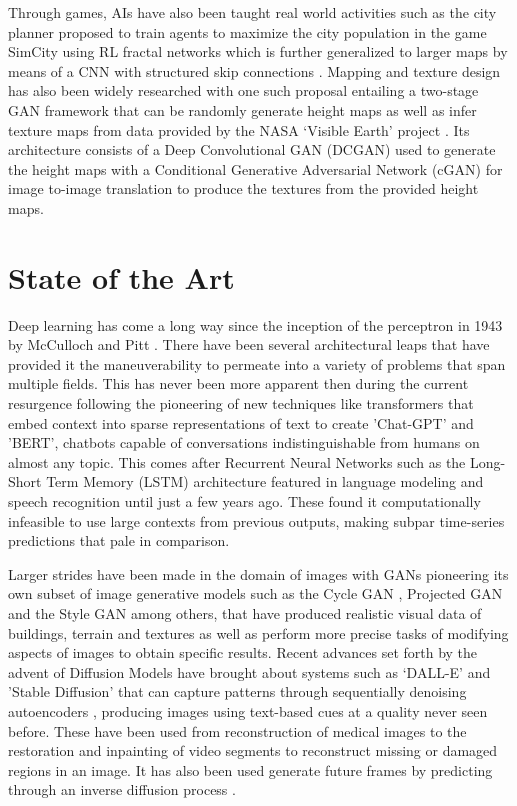 \documentclass{Configuration_Files/PoliMi3i_thesis}
\begin{document}
Through games, AIs have also been taught real world activities such as the city 
planner proposed  to train agents to maximize the city population in the game SimCity 
using RL fractal networks which is further generalized to larger maps by means of a  
CNN with structured skip connections \cite{SaE20}. Mapping and texture design has 
also been widely researched with one such proposal entailing a two-stage GAN framework 
that can be randomly generate height maps as well as infer texture maps from data 
provided by the NASA ‘Visible Earth’ project \cite{ChB17}. Its architecture consists of a Deep 
Convolutional GAN (DCGAN) used to generate the height maps with a Conditional Generative
Adversarial Network (cGAN) for image to-image translation to produce the textures from the 
provided height maps. 

\section{State of the Art}
Deep learning has come a long way since the inception of the perceptron in 
1943 by McCulloch and Pitt \cite{WaM90}. There have been several architectural leaps 
that have provided it the maneuverability to permeate into a variety of problems that
span multiple fields. This has never been more apparent then during the current resurgence following 
the pioneering of new techniques like transformers \cite{AsV17} that embed context into sparse 
representations of text to create 'Chat-GPT' and 'BERT', chatbots capable of conversations indistinguishable 
from humans on almost any topic. This comes after Recurrent Neural Networks such as the Long-Short 
Term Memory (LSTM) architecture \cite{SeH97} featured in language modeling and speech recognition 
until just a few years ago. These found it computationally infeasible to use large contexts from previous 
outputs, making subpar time-series predictions \cite{AlZ19} that pale in comparison.

Larger strides have been made in the domain of images with GANs pioneering its own subset of 
image generative models such as the Cycle GAN \cite{JuZ17}, Projected GAN \cite{AxS21} and 
the Style GAN \cite{TeK19} among others, that have produced realistic visual data of buildings, terrain 
and textures \cite{ChB17,TiT11} as well as perform more precise tasks of modifying aspects of images to 
obtain specific results. Recent advances set forth by the advent of Diffusion Models have brought about 
systems such as ‘DALL-E’ and 'Stable Diffusion' that can capture patterns through sequentially denoising 
autoencoders \cite{RoR22}, producing images using text-based cues at a quality never seen before. These 
have been used from reconstruction of medical images to the restoration and inpainting of video segments to 
reconstruct missing or damaged regions in an image. It has also been used generate future frames by predicting 
through an inverse diffusion process \cite{LiY22}. 
\end{document}
